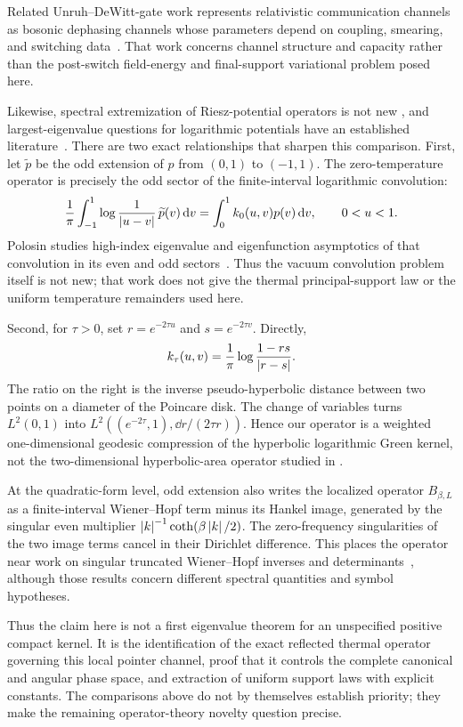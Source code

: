 Related Unruh--DeWitt-gate work represents relativistic communication
channels as bosonic dephasing channels whose parameters depend on coupling,
smearing, and switching data~\cite{AsplingLawler2023}.  That work concerns
channel structure and capacity rather than the post-switch field-energy and
final-support variational problem posed here.

Likewise, spectral extremization of Riesz-potential operators is not new
\cite{RuzhanskySuragan2016}, and largest-eigenvalue questions for logarithmic
potentials have an established literature~\cite{AnoopJohnson2025,
JohnsonVerma2026}.  There are two exact relationships that sharpen this
comparison.  First, let $\widetilde p$ be the odd extension of $p$ from
$(0,1)$ to $(-1,1)$.  The zero-temperature operator is precisely the odd
sector of the finite-interval logarithmic convolution:
\begin{equation}
 \frac1\pi\int_{-1}^{1}\log\frac1{\left\lvert u-v\right\rvert}\,
 \widetilde p(v)\,\mathrm d v
 =\int_0^1 k_0(u,v)p(v)\,\mathrm d v,
 \qquad 0<u<1.
 \label{eq:odd-log-convolution}
\end{equation}
Polosin studies high-index eigenvalue and eigenfunction asymptotics of that
convolution in its even and odd sectors~\cite{Polosin2022}.  Thus the vacuum
convolution problem itself is not new; that work does not give the thermal
principal-support law or the uniform temperature remainders used here.

Second, for $\tau>0$, set $r=e^{-2\tau u}$ and
$s=e^{-2\tau v}$.  Directly,
\begin{equation}
 k_\tau(u,v)=\frac1\pi\log\frac{1-rs}{\left\lvert r-s\right\rvert}.
 \label{eq:hyperbolic-cross-ratio}
\end{equation}
The ratio on the right is the inverse pseudo-hyperbolic distance between two
points on a diameter of the Poincare disk.  The change of variables turns
$L^2(0,1)$ into
$L^2((e^{-2\tau},1),\dd r/(2\tau r))$.  Hence our operator is a weighted
one-dimensional geodesic compression of the hyperbolic logarithmic Green
kernel, not the two-dimensional hyperbolic-area operator studied in
\cite{JohnsonVerma2026}.

At the quadratic-form level, odd extension also writes the localized operator
$B_{\beta,L}$ as a finite-interval Wiener--Hopf term minus its Hankel image,
generated by the singular even multiplier
$\left\lvert k\right\rvert^{-1}\coth(\beta\left\lvert k\right\rvert/2)$.  The zero-frequency singularities of the
two image terms cancel in their Dirichlet difference.  This places the
operator near work on singular truncated Wiener--Hopf inverses and
determinants~\cite{Widom2006,Kozlowski2008}, although those results concern
different spectral quantities and symbol hypotheses.

Thus the claim here is not a first eigenvalue theorem for an unspecified
positive compact kernel.  It is the identification of the exact reflected
thermal operator governing this local pointer channel, proof that it controls
the complete canonical and angular phase space, and extraction of uniform
support laws with explicit constants.  The comparisons above do not by
themselves establish priority; they make the remaining operator-theory
novelty question precise.
